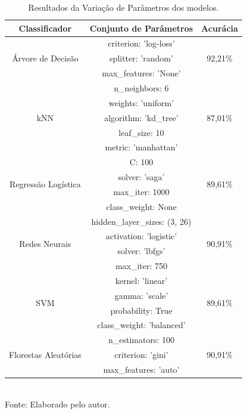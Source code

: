 \documentclass[a4paper,12pt]{article} %
\begin{document}
\begin{table}[H]
    \centering
    \caption{Resultados da Variação de Parâmetros dos modelos.}
    \begin{tabular}{c|c|c}
    \hline
    Classificador & Conjunto de Parâmetros & Acurácia \\
    \hline
    \multirow{3}{*}{Árvore de Decisão} & criterion: 'log-loss' & \multirow{3}{*}{92,21\%} \\
     & splitter: 'random' & \\
     & max\_features: 'None' & \\
    \hline
    \multirow{5}{*}{kNN} & n\_neighbors: 6 & \multirow{5}{*}{87,01\%} \\
     & weights: 'uniform' & \\
     & algorithm: 'kd\_tree' & \\
     & leaf\_size: 10 & \\
     & metric: 'manhattan' & \\
    \hline
    \multirow{4}{*}{Regressão Logística} & C: 100 & \multirow{4}{*}{89,61\%} \\
     & solver: 'saga' & \\
     & max\_iter: 1000 & \\
     & class\_weight: None & \\
    \hline
    \multirow{4}{*}{Redes Neurais} & hidden\_layer\_sizes: (3, 26) & \multirow{4}{*}{90,91\%} \\
     & activation: 'logistic' & \\
     & solver: 'lbfgs' & \\
     & max\_iter: 750 & \\
    \hline
    \multirow{4}{*}{SVM} & kernel: 'linear' & \multirow{4}{*}{89,61\%} \\
     & gamma: 'scale' &  \\
     & probability: True & \\
     & class\_weight: 'balanced' & \\
    \hline
    \multirow{3}{*}{Florestas Aleatórias} & n\_estimators: 100 & \multirow{3}{*}{90,91\%} \\
     & criterion: 'gini' & \\
     & max\_features: 'auto' & \\
    \hline\hline
    \end{tabular}
    \label{tab:3}
    \\
    Fonte: Elaborado pelo autor.
\end{table}
\end{document}
